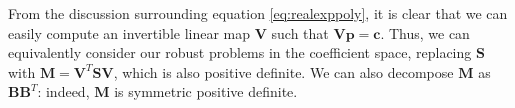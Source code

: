 From the discussion surrounding equation \ref{eq:realexppoly}, it is clear that we can easily compute an invertible linear map $\mathbf{V}$ such that $\mathbf{Vp} = \mathbf{c}$. Thus, we can equivalently consider our robust problems in the coefficient space, replacing $\mathbf{S}$ with $\mathbf{M} = \mathbf{V}^T\mathbf{SV}$, which is also positive definite. We can also decompose $\mathbf{M}$ as $\mathbf{B}\mathbf{B}^T$: indeed, $\mathbf{M}$ is symmetric positive definite. 


